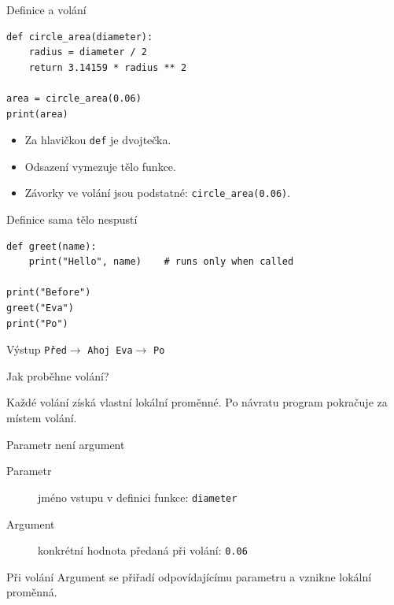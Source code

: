 \documentclass[aspectratio=169]{beamer}
\begin{document}
\begin{frame}[fragile]{Definice a volání}
\begin{lstlisting}[style=python]
def circle_area(diameter):
    radius = diameter / 2
    return 3.14159 * radius ** 2

area = circle_area(0.06)
print(area)
\end{lstlisting}
  \begin{itemize}
    \item Za hlavičkou \texttt{def} je dvojtečka.
    \item Odsazení vymezuje tělo funkce.
    \item Závorky ve volání jsou podstatné: \texttt{circle\_area(0.06)}.
  \end{itemize}
\end{frame}

\begin{frame}[fragile]{Definice sama tělo nespustí}
\begin{lstlisting}[style=python]
def greet(name):
    print("Hello", name)    # runs only when called

print("Before")
greet("Eva")
print("Po")
\end{lstlisting}
  \begin{block}{Výstup}
    \texttt{Před}\quad $\rightarrow$ \quad\texttt{Ahoj Eva}\quad $\rightarrow$ \quad\texttt{Po}
  \end{block}
\end{frame}

\begin{frame}{Jak proběhne volání?}
  \centering
  \vspace{4mm}

  Každé volání získá vlastní lokální proměnné. Po návratu program pokračuje za místem volání.
\end{frame}

\begin{frame}{Parametr není argument}
  \begin{description}
    \item[Parametr] jméno vstupu v definici funkce: \texttt{diameter}
    \item[Argument] konkrétní hodnota předaná při volání: \texttt{0.06}
  \end{description}
  \begin{block}{Při volání}
    Argument se přiřadí odpovídajícímu parametru a vznikne lokální proměnná.
  \end{block}
\end{frame}
\end{document}
